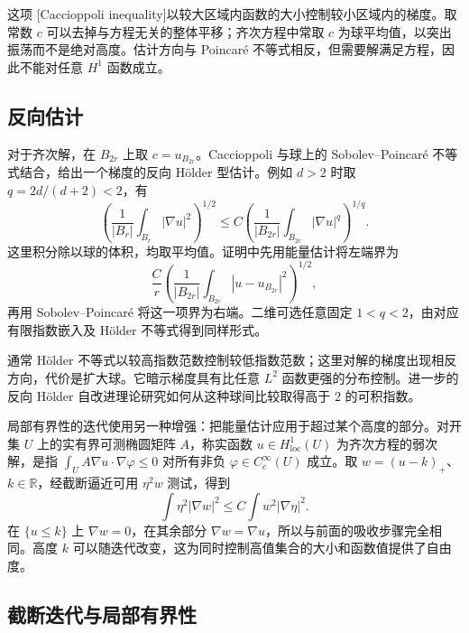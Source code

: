 这项 [Caccioppoli inequality]以较大区域内函数的大小控制较小区域内的梯度。取常数 \(c\) 可以去掉与方程无关的整体平移；齐次方程中常取 \(c\) 为球平均值，以突出振荡而不是绝对高度。估计方向与 Poincaré 不等式相反，但需要解满足方程，因此不能对任意 \(H^1\) 函数成立。

\subsection{反向估计}
\label{b2:subsec:160402}

对于齐次解，在 \(B_{2r}\) 上取 \(c=u_{B_{2r}}\)。Caccioppoli 与球上的 Sobolev--Poincaré 不等式结合，给出一个梯度的反向 Hölder 型估计。例如 \(d>2\) 时取 \(q=2d/(d+2)<2\)，有
\[
 \left(\frac1{|B_r|}\int_{B_r}|\nabla u|^2\right)^{1/2}
 \le C\left(\frac1{|B_{2r}|}\int_{B_{2r}}|\nabla u|^q\right)^{1/q}.
\]
这里积分除以球的体积，均取平均值。证明中先用能量估计将左端界为
\[
 \frac Cr\left(\frac1{|B_{2r}|}\int_{B_{2r}}|u-u_{B_{2r}}|^2\right)^{1/2},
\]
再用 Sobolev--Poincaré 将这一项界为右端。二维可选任意固定 \(1<q<2\)，由对应有限指数嵌入及 Hölder 不等式得到同样形式。

\ProseParagraphBreak

通常 Hölder 不等式以较高指数范数控制较低指数范数；这里对解的梯度出现相反方向，代价是扩大球。它暗示梯度具有比任意 \(L^2\) 函数更强的分布控制。进一步的反向 Hölder 自改进理论研究如何从这种球间比较取得高于 \(2\) 的可积指数。

\ProseParagraphBreak

局部有界性的迭代使用另一种增强：把能量估计应用于超过某个高度的部分。对开集 \(U\) 上的实有界可测椭圆矩阵 \(A\)，称实函数 \(u\in H^1_{\mathrm{loc}}(U)\) 为齐次方程的弱次解，是指 \(\int_U A\nabla u\cdot\nabla\varphi\le0\) 对所有非负 \(\varphi\in C_c^\infty(U)\) 成立。取 \(w=(u-k)_+\)、\(k\in\mathbb R\)，经截断逼近可用 \(\eta^2w\) 测试，得到
\[\int\eta^2|\nabla w|^2\le C\int w^2|\nabla\eta|^2.\]
在 \(\{u\le k\}\) 上 \(\nabla w=0\)，在其余部分 \(\nabla w=\nabla u\)，所以与前面的吸收步骤完全相同。高度 \(k\) 可以随迭代改变，这为同时控制高值集合的大小和函数值提供了自由度。

\subsection{截断迭代与局部有界性}
\label{b2:subsec:160403}

